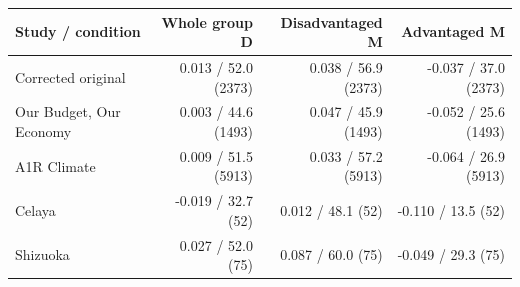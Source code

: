 
\begin{tabular}{lrrr}
\toprule
Study / condition & Whole group D & Disadvantaged M & Advantaged M\\
\midrule
Corrected original & 0.013 / 52.0 (2373) & 0.038 / 56.9 (2373) & -0.037 / 37.0 (2373)\\
Our Budget, Our Economy & 0.003 / 44.6 (1493) & 0.047 / 45.9 (1493) & -0.052 / 25.6 (1493)\\
A1R Climate & 0.009 / 51.5 (5913) & 0.033 / 57.2 (5913) & -0.064 / 26.9 (5913)\\
Celaya & -0.019 / 32.7 (52) & 0.012 / 48.1 (52) & -0.110 / 13.5 (52)\\
Shizuoka & 0.027 / 52.0 (75) & 0.087 / 60.0 (75) & -0.049 / 29.3 (75)\\
\bottomrule
\end{tabular}

